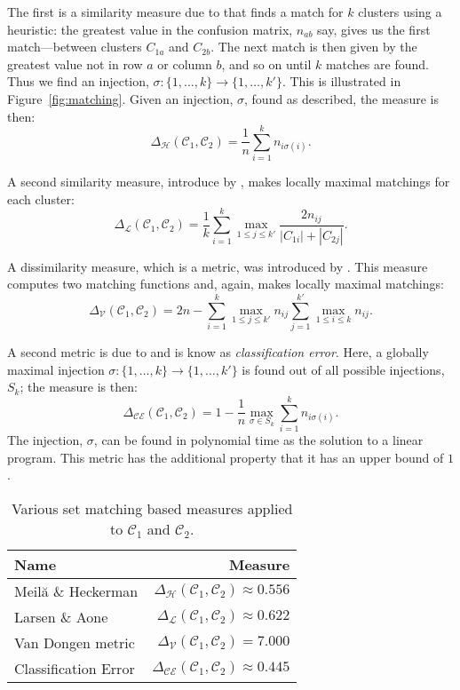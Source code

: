 \documentclass[a4paper]{report}
\newcommand{\clus}{\mathcal{C}}
\newcommand{\partcompare}[1]{\Delta_{\mathcal{#1}}(\clus_1,\clus_2)}
\begin{document}
The first is a similarity measure due to \citet{meila-2001} that finds a
match for $k$ clusters using a heuristic: the greatest value in the confusion
matrix, $n_{ab}$ say, gives us the first match---between clusters $C_{1a}$ and
$C_{2b}$.  The next match is then given by the greatest value not in row $a$
or column $b$, and so on until $k$ matches are found.  Thus we find an
injection, $\sigma \colon \{1,\dotsc,k\} \to \{1,\dotsc,k'\}$.  This is
illustrated in Figure~\ref{fig:matching}.  Given an injection, $\sigma$, found
as described, the measure is then:
\begin{equation*}
  \partcompare{H} = \frac{1}{n} \sum_{i=1}^{k} n_{i \sigma(i)}.
\end{equation*}

A second similarity measure, introduce by \citet{larsen-aone-1999}, makes
locally maximal matchings for each cluster:
\begin{equation*}
  \partcompare{L} = \frac{1}{k} \sum_{i=1}^{k} \max_{1 \leq j \leq k'}
                                             \frac{2n_{ij}}{|C_{1i}|+|C_{2j}|}.
\end{equation*}

A dissimilarity measure, which is a metric, was introduced by
\citet{van-dongen-2000}.  This measure computes two matching functions and,
again, makes locally maximal matchings:
\begin{equation*}
  \partcompare{V} = 2n - \sum_{i=1}^{k} \max_{1 \leq j \leq k'} n_{ij}
                         \sum_{j=1}^{k'} \max_{1 \leq i \leq k} n_{ij}.
\end{equation*}

A second metric is due to \citet{meila-2005} and is know as
\textit{classification error}.  Here, a globally maximal injection $\sigma
\colon \{1,\dotsc,k\} \to \{1,\dotsc,k'\}$ is found out of all possible
injections, $S_k$; the measure is then:
\begin{equation*}
  \partcompare{CE} = 1 - \frac{1}{n} \max_{\sigma \in S_k}
                                     \sum_{i=1}^{k} n_{i \sigma(i)}.
\end{equation*}
The injection, $\sigma$, can be found in polynomial time as the solution to a
linear program.  This metric has the additional property that it has an upper
bound of $1$.

\begin{table}
  \centering
  \begin{tabular}{lr}
    \toprule
    Name & Measure \\
    \midrule
    Meilă \& Heckerman   & $\partcompare{H} \approx 0.556$ \\
    Larsen \& Aone       & $\partcompare{L} \approx 0.622$ \\
    Van Dongen metric    & $\partcompare{V} = 7.000$ \\
    Classification Error & $\partcompare{CE} \approx 0.445$ \\
    
    \bottomrule
  \end{tabular}
  \caption{Various set matching based measures applied to $\clus_1$ and $\clus_2$.}
  \label{tab:set-matching-comparison}
\end{table}
\end{document}
